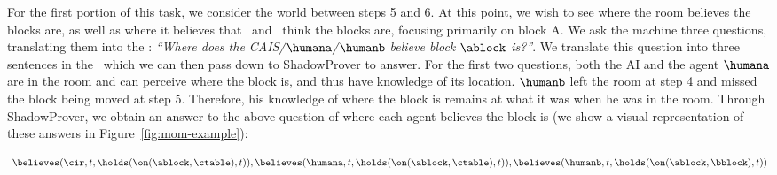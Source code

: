 For the first portion of this task, we consider the world between
steps 5 and 6.  At this point, we wish to see where the room believes
the blocks are, as well as where it believes that \humana\ and
\humanb\ think the blocks are, focusing primarily on block A.  We ask
the machine three questions, translating them into the \CEC:
\emph{``Where does the CAIS/$\humana$/$\humanb$ believe block
  $\ablock$ is?''}.  We translate this question into three sentences
in the \CEC\ which we can then pass down to \textsf{ShadowProver} to
answer.
For the first two questions, both the AI and the agent $\humana$ are
in the room and can perceive where the block is, and thus have
knowledge of its location.  $\humanb$ left the room at step 4 and
missed the block being moved at step 5.  Therefore, his knowledge of
where the block is remains at what it was when he was in the room. Through
\textsf{ShadowProver}, we obtain an answer to the above question
of where each agent believes the block is (we show a visual representation
of these answers in Figure~\ref{fig:mom-example}): 

\vspace{-0.1in}
\begin{footnotesize}
\begin{equation*}
\begin{aligned}\
{\believes(\cir, t, \holds(\on(\ablock, \ctable), t)), \believes(\humana, t, \holds(\on(\ablock, \ctable), t)),
\believes(\humanb, t, \holds(\on(\ablock, \bblock), t))}
\end{aligned}
\end{equation*}
\end{footnotesize}
\vspace{-0.15in}